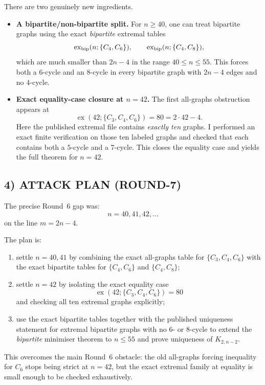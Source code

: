 There are two genuinely new ingredients.

\begin{itemize}
\item[(N1)] \textbf{A bipartite/non-bipartite split.}
For $n\ge 40$, one can treat bipartite graphs using the exact \emph{bipartite} extremal tables
\[
\operatorname{ex}_{\rm bip}(n;\{C_4,C_6\}),\qquad
\operatorname{ex}_{\rm bip}(n;\{C_4,C_8\}),
\]
which are much smaller than $2n-4$ in the range $40\le n\le 55$.
This forces both a $6$-cycle and an $8$-cycle in every bipartite graph with $2n-4$ edges and no $4$-cycle.

\item[(N2)] \textbf{Exact equality-case closure at $n=42$.}
The first all-graphs obstruction appears at
\[
\operatorname{ex}(42;\{C_3,C_4,C_6\})=80=2\cdot 42-4.
\]
Here the published extremal file contains \emph{exactly ten} graphs.
I performed an exact finite verification on those ten labeled graphs and checked that each contains both a $5$-cycle and a $7$-cycle.
This closes the equality case and yields the full theorem for $n=42$.
\end{itemize}

\subsection*{4) ATTACK PLAN (ROUND-7)}

The precise Round~6 gap was:
\[
n=40,41,42,\dots
\]
on the line $m=2n-4$.

The plan is:
\begin{enumerate}
\item settle $n=40,41$ by combining the exact all-graphs table for $\{C_3,C_4,C_6\}$ with the exact bipartite tables for $\{C_4,C_6\}$ and $\{C_4,C_8\}$;
\item settle $n=42$ by isolating the exact equality case
\[
\operatorname{ex}(42;\{C_3,C_4,C_6\})=80
\]
and checking all ten extremal graphs explicitly;
\item use the exact bipartite tables together with the published uniqueness statement for extremal bipartite graphs with no $6$- or $8$-cycle to extend the \emph{bipartite} minimiser theorem to $n\le 55$ and prove uniqueness of $K_{2,n-2}$.
\end{enumerate}

This overcomes the main Round~6 obstacle: the old all-graphs forcing inequality for $C_6$ stops being strict at $n=42$, but the exact extremal family at equality is small enough to be checked exhaustively.

